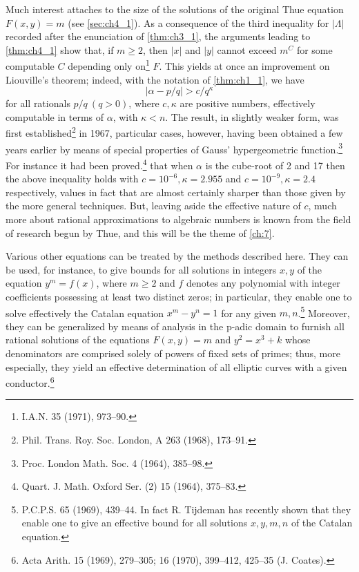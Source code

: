 Much interest attaches to the size of the solutions of the original Thue equation $F(x,y)=m$ (see \autoref{sec:ch4_1}). As a consequence of the third inequality for $|\Lambda|$ recorded after the enunciation of \autoref{thm:ch3_1}, the arguments leading to \autoref{thm:ch4_1} show that, if $m \ge 2$, then $|x|$ and $|y|$ cannot exceed $m^C$ for some computable $C$ depending only on\footnote{I.A.N. 35 (1971), 973--90.} $F$. 
This yields at once an improvement on Liouville's theorem; indeed, with the notation of \autoref{thm:ch1_1}, we have
\[
|\alpha - p/q| > c/q^{\kappa}
\]
for all rationals $p/q \ (q>0)$, where $c, \kappa$ are positive numbers, effectively computable in terms of $\alpha$, with $\kappa < n$. The result, in slightly weaker form, was first established\footnote{Phil. Trans. Roy. Soc. London, A 263 (1968), 173--91.} in 1967,  
particular cases, however, having been obtained a few years earlier by means of special properties of Gauss' hypergeometric function.\footnote{Proc. London Math. Soc. 4 (1964), 385--98.} 
For instance it had been proved.\footnote{Quart. J. Math. Oxford Ser. (2) 15 (1964), 375--83.} that when $\alpha$ is the cube-root of 2 and 17 then the above inequality holds with $c=10^{-6}, \kappa=2.955$ and $c=10^{-9}, \kappa=2.4$ respectively, values in fact that are almost certainly sharper than those given by the more general techniques. But, leaving aside the effective nature of $c$, much more about rational approximations to algebraic numbers is known from the field of research begun by Thue, and this will be the theme of \autoref{ch:7}.

Various other equations can be treated by the methods described here. They can be used, for instance, to give bounds for all solutions in integers $x, y$ of the equation $y^m = f(x)$, where $m \ge 2$ and $f$ denotes any polynomial with integer coefficients possessing at least two distinct zeros; in particular, they enable one to solve effectively the Catalan equation $x^m - y^n = 1$ for any given $m, n$.\footnote{P.C.P.S. 65 (1969), 439--44. In fact R. Tijdeman has recently shown that they enable one to give an effective bound for all solutions $x, y, m, n$ of the Catalan equation.} 
Moreover, they can be generalized by means of analysis in the p-adic domain to furnish all rational solutions of the equations $F(x,y) = m$ and $y^2 = x^3 + k$ whose denominators are comprised solely of powers of fixed sets of primes; thus, more especially, they yield an effective determination of all elliptic curves with a given conductor.\footnote{Acta Arith. 15 (1969), 279--305; 16 (1970), 399--412, 425--35 (J. Coates).}
